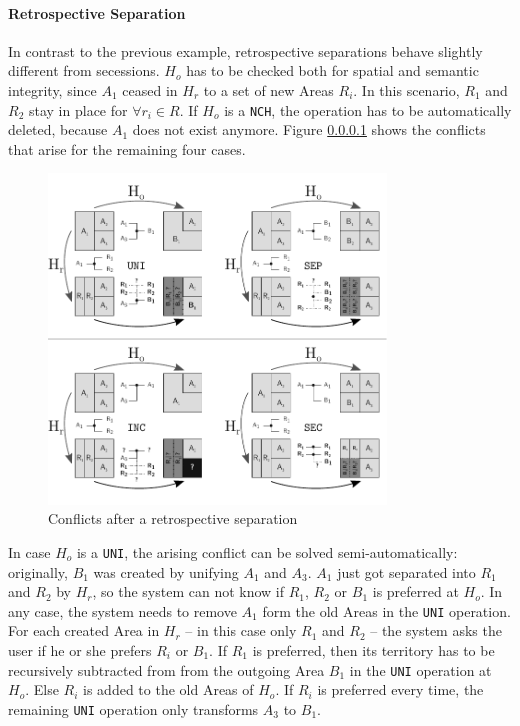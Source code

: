 \paragraph{Retrospective Separation} %
\label{par:retrospective_separation}

In contrast to the previous example, retrospective separations behave slightly different from secessions. $H_o$ has to be checked both for spatial and semantic integrity, since $A_1$ ceased in $H_r$ to a set of new Areas $R_i$. In this scenario, $R_1$ and $R_2$ stay in place for $\forall r_i \in R$. If $H_o$ is a \texttt{NCH}, the operation has to be automatically deleted, because $A_1$ does not exist anymore. Figure \ref{par:retrospective_separation} shows the conflicts that arise for the remaining four cases.

\begin{figure}[ht]
\vspace{1em}
  \centering
  \includegraphics[width=0.8\textwidth]{graphics/development/editing_hivent_data/retrospective_updates/SEP}
  \caption{Conflicts after a retrospective separation}
  \label{fig:update_conflict_SEP}
\end{figure}

In case $H_o$ is a \texttt{UNI}, the arising conflict can be solved semi-automatically: originally, $B_1$ was created by unifying $A_1$ and $A_3$. $A_1$ just got separated into $R_1$ and $R_2$ by $H_r$, so the system can not know if $R_1$, $R_2$ or $B_1$ is preferred at $H_o$. In any case, the system needs to remove $A_1$ form the old Areas in the \texttt{UNI} operation. For each created Area in $H_r$ -- in this case only $R_1$ and $R_2$ -- the system asks the user if he or she prefers $R_i$ or $B_1$. If $R_1$ is preferred, then its territory has to be recursively subtracted from from the outgoing Area $B_1$ in the \texttt{UNI} operation at $H_o$. Else $R_i$ is added to the old Areas of $H_o$. If $R_i$ is preferred every time, the remaining \texttt{UNI} operation only transforms $A_3$ to $B_1$.

